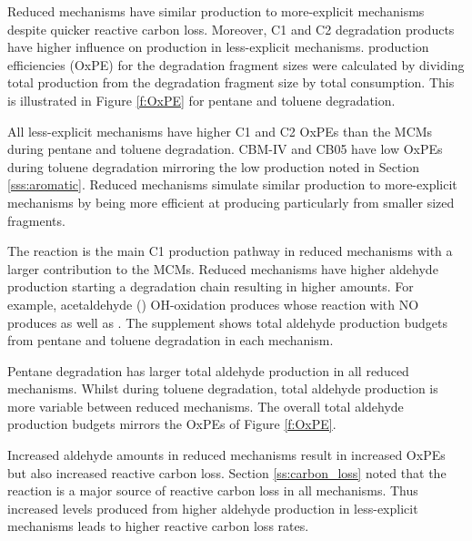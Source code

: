 Reduced mechanisms have similar  production to more-explicit mechanisms despite quicker reactive carbon loss.
Moreover, C1 and C2 degradation products have higher influence on  production in less-explicit mechanisms.
 production efficiencies (OxPE) for the degradation fragment sizes were calculated by dividing total  production from the degradation fragment size by total  consumption.
This is illustrated in Figure \ref{f:OxPE} for pentane and toluene degradation.

All less-explicit mechanisms have higher C1 and C2 OxPEs than the MCMs during pentane and toluene degradation.
CBM-IV and CB05 have low OxPEs during toluene degradation mirroring the low  production noted in Section \ref{sss:aromatic}.
Reduced mechanisms simulate similar  production to more-explicit mechanisms by being more efficient at producing  particularly from smaller sized fragments.

The  reaction is the main C1  production pathway in reduced mechanisms with a larger contribution to the MCMs.
Reduced mechanisms have higher aldehyde production starting a degradation chain resulting in higher  amounts.
For example, acetaldehyde () OH-oxidation produces  whose reaction with NO produces  as well as .
The supplement shows total aldehyde production budgets from pentane and toluene degradation in each mechanism.  

Pentane degradation has larger total aldehyde production in all reduced mechanisms.
Whilst during toluene degradation, total aldehyde production is more variable between reduced mechanisms.
The overall total aldehyde production budgets mirrors the OxPEs of Figure \ref{f:OxPE}.

Increased aldehyde amounts in reduced mechanisms result in increased OxPEs but also increased reactive carbon loss.
Section \ref{ss:carbon_loss} noted that the  reaction is a major source of reactive carbon loss in all mechanisms. 
Thus increased  levels produced from higher aldehyde production in less-explicit mechanisms leads to higher reactive carbon loss rates.
